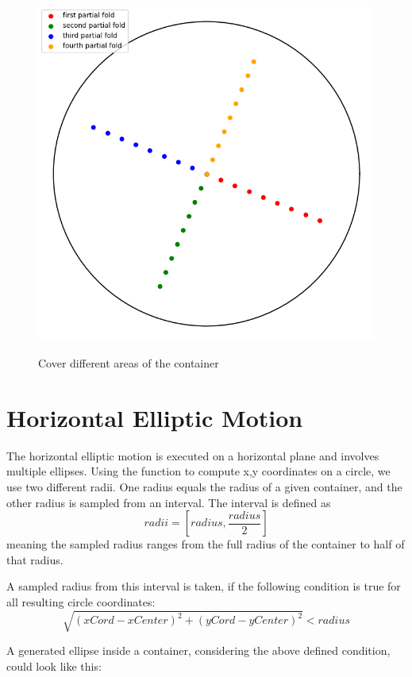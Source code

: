 \begin{figure}[H]
    \includegraphics[scale=0.35]{Graphics/motions/folding1.png}
    \centering
    \label{fig:foldingMotion1}
    \caption{Cover different areas of the container}
\end{figure}

\section{Horizontal Elliptic Motion}
The horizontal elliptic motion is executed on a horizontal plane and involves multiple ellipses.
Using the function to compute x,y coordinates on a circle, we use two different radii.
One radius equals the radius of a given container, and the other radius is sampled from an interval. The interval is defined as \[radii = [radius, \frac{radius} {2} ]\]
meaning the sampled radius ranges from the full radius of the container to half of that radius.

A sampled radius from this interval is taken, if the following condition is true for all resulting circle coordinates:
\[\sqrt{(xCord - xCenter)^2 + (yCord - yCenter)^2} < radius\] 

A generated ellipse inside a container, considering the above defined condition, could look like this:

